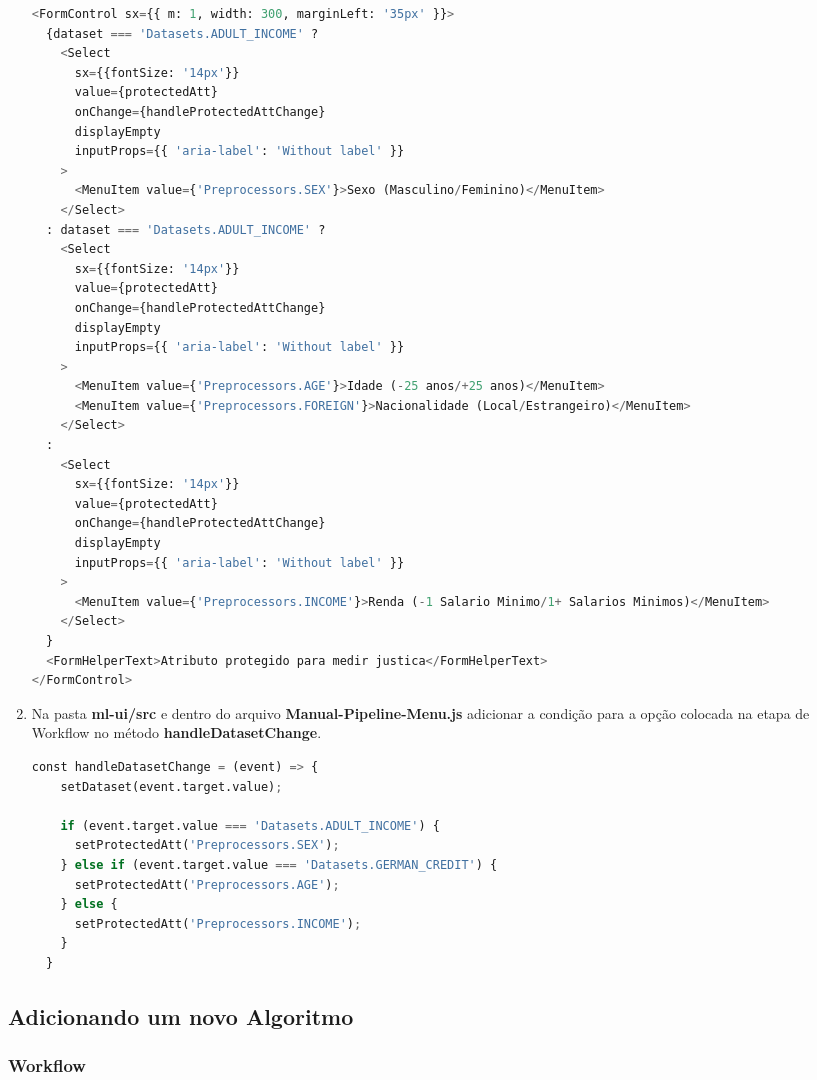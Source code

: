 \documentclass[portugues]{ic-tese}
\begin{document}
\begin{enumerate}
\begin{lstlisting}[language=Python, label=cod:AddDatasetManual]
<FormControl sx={{ m: 1, width: 300, marginLeft: '35px' }}>
  {dataset === 'Datasets.ADULT_INCOME' ?
    <Select
      sx={{fontSize: '14px'}}
      value={protectedAtt}
      onChange={handleProtectedAttChange}
      displayEmpty
      inputProps={{ 'aria-label': 'Without label' }}
    >
      <MenuItem value={'Preprocessors.SEX'}>Sexo (Masculino/Feminino)</MenuItem>
    </Select>
  : dataset === 'Datasets.ADULT_INCOME' ?
    <Select
      sx={{fontSize: '14px'}}
      value={protectedAtt}
      onChange={handleProtectedAttChange}
      displayEmpty
      inputProps={{ 'aria-label': 'Without label' }}
    >
      <MenuItem value={'Preprocessors.AGE'}>Idade (-25 anos/+25 anos)</MenuItem>
      <MenuItem value={'Preprocessors.FOREIGN'}>Nacionalidade (Local/Estrangeiro)</MenuItem>
    </Select>
  :
    <Select
      sx={{fontSize: '14px'}}
      value={protectedAtt}
      onChange={handleProtectedAttChange}
      displayEmpty
      inputProps={{ 'aria-label': 'Without label' }}
    >
      <MenuItem value={'Preprocessors.INCOME'}>Renda (-1 Salario Minimo/1+ Salarios Minimos)</MenuItem>
    </Select>
  }
  <FormHelperText>Atributo protegido para medir justica</FormHelperText>
</FormControl>
\end{lstlisting}

\item Na pasta \textbf{ml-ui/src} e dentro do arquivo \textbf{Manual-Pipeline-Menu.js} adicionar a condição para a opção colocada na etapa de Workflow no método \textbf{handleDatasetChange}.

\begin{lstlisting}[language=Python, label=cod:AddDatasetManual]
  const handleDatasetChange = (event) => {
    setDataset(event.target.value);

    if (event.target.value === 'Datasets.ADULT_INCOME') {
      setProtectedAtt('Preprocessors.SEX');
    } else if (event.target.value === 'Datasets.GERMAN_CREDIT') {
      setProtectedAtt('Preprocessors.AGE');
    } else {
      setProtectedAtt('Preprocessors.INCOME');
    }
  }
\end{lstlisting}
\end{enumerate}

\subsection{Adicionando um novo Algoritmo}

\subsubsection{Workflow}
\end{document}
